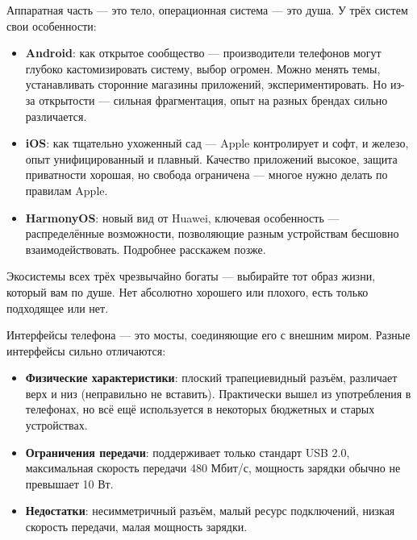 
Аппаратная часть — это тело, операционная система — это душа. У трёх систем свои особенности:

\begin{itemize}
  \item \textbf{Android}: как открытое сообщество — производители телефонов могут глубоко кастомизировать систему, выбор огромен. Можно менять темы, устанавливать сторонние магазины приложений, экспериментировать. Но из-за открытости — сильная фрагментация, опыт на разных брендах сильно различается.
  \item \textbf{iOS}: как тщательно ухоженный сад — Apple контролирует и софт, и железо, опыт унифицированный и плавный. Качество приложений высокое, защита приватности хорошая, но свобода ограничена — многое нужно делать по правилам Apple.
  \item \textbf{HarmonyOS}: новый вид от Huawei, ключевая особенность — распределённые возможности, позволяющие разным устройствам бесшовно взаимодействовать. Подробнее расскажем позже.
\end{itemize}

Экосистемы всех трёх чрезвычайно богаты — выбирайте тот образ жизни, который вам по душе. Нет абсолютно хорошего или плохого, есть только подходящее или нет.


Интерфейсы телефона — это мосты, соединяющие его с внешним миром. Разные интерфейсы сильно отличаются:


\begin{itemize}
  \item \textbf{Физические характеристики}: плоский трапециевидный разъём, различает верх и низ (неправильно не вставить). Практически вышел из употребления в телефонах, но всё ещё используется в некоторых бюджетных и старых устройствах.
  \item \textbf{Ограничения передачи}: поддерживает только стандарт USB 2.0, максимальная скорость передачи 480 Мбит/с, мощность зарядки обычно не превышает 10 Вт.
  \item \textbf{Недостатки}: несимметричный разъём, малый ресурс подключений, низкая скорость передачи, малая мощность зарядки.
\end{itemize}


